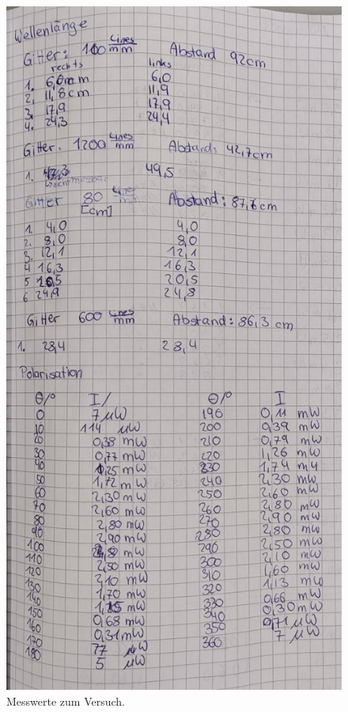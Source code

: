 \begin{figure}[h]
    \centering
     \includegraphics[scale=0.3]{Abbildungen/Kladde2.jpg}
    \caption{Messwerte zum Versuch.}
\end{figure}
